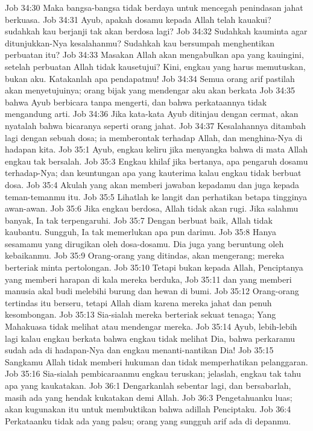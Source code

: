 Job 34:30  Maka bangsa-bangsa tidak berdaya untuk mencegah penindasan jahat berkuasa.
Job 34:31  Ayub, apakah dosamu kepada Allah telah kauakui? sudahkah kau berjanji tak akan berdosa lagi?
Job 34:32  Sudahkah kauminta agar ditunjukkan-Nya kesalahanmu? Sudahkah kau bersumpah menghentikan perbuatan itu?
Job 34:33  Masakan Allah akan mengabulkan apa yang kauingini, setelah perbuatan Allah tidak kausetujui? Kini, engkau yang harus memutuskan, bukan aku. Katakanlah apa pendapatmu!
Job 34:34  Semua orang arif pastilah akan menyetujuinya; orang bijak yang mendengar aku akan berkata
Job 34:35  bahwa Ayub berbicara tanpa mengerti, dan bahwa perkataannya tidak mengandung arti.
Job 34:36  Jika kata-kata Ayub ditinjau dengan cermat, akan nyatalah bahwa bicaranya seperti orang jahat.
Job 34:37  Kesalahannya ditambah lagi dengan sebuah dosa; ia memberontak terhadap Allah, dan menghina-Nya di hadapan kita.
Job 35:1  Ayub, engkau keliru jika menyangka bahwa di mata Allah engkau tak bersalah.
Job 35:3  Engkau khilaf jika bertanya, apa pengaruh dosamu terhadap-Nya; dan keuntungan apa yang kauterima kalau engkau tidak berbuat dosa.
Job 35:4  Akulah yang akan memberi jawaban kepadamu dan juga kepada teman-temanmu itu.
Job 35:5  Lihatlah ke langit dan perhatikan betapa tingginya awan-awan.
Job 35:6  Jika engkau berdosa, Allah tidak akan rugi. Jika salahmu banyak, Ia tak terpengaruhi.
Job 35:7  Dengan berbuat baik, Allah tidak kaubantu. Sungguh, Ia tak memerlukan apa pun darimu.
Job 35:8  Hanya sesamamu yang dirugikan oleh dosa-dosamu. Dia juga yang beruntung oleh kebaikanmu.
Job 35:9  Orang-orang yang ditindas, akan mengerang; mereka berteriak minta pertolongan.
Job 35:10  Tetapi bukan kepada Allah, Penciptanya yang memberi harapan di kala mereka berduka,
Job 35:11  dan yang memberi manusia akal budi melebihi burung dan hewan di bumi.
Job 35:12  Orang-orang tertindas itu berseru, tetapi Allah diam karena mereka jahat dan penuh kesombongan.
Job 35:13  Sia-sialah mereka berteriak sekuat tenaga; Yang Mahakuasa tidak melihat atau mendengar mereka.
Job 35:14  Ayub, lebih-lebih lagi kalau engkau berkata bahwa engkau tidak melihat Dia, bahwa perkaramu sudah ada di hadapan-Nya dan engkau menanti-nantikan Dia!
Job 35:15  Sangkamu Allah tidak memberi hukuman dan tidak memperhatikan pelanggaran.
Job 35:16  Sia-sialah pembicaraanmu engkau teruskan; jelaslah, engkau tak tahu apa yang kaukatakan.
Job 36:1  Dengarkanlah sebentar lagi, dan bersabarlah, masih ada yang hendak kukatakan demi Allah.
Job 36:3  Pengetahuanku luas; akan kugunakan itu untuk membuktikan bahwa adillah Penciptaku.
Job 36:4  Perkataanku tidak ada yang palsu; orang yang sungguh arif ada di depanmu.
